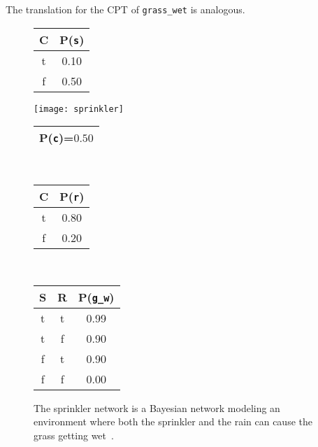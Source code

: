 \documentclass[a4paper]{article}
\begin{document}
The translation for the CPT of \texttt{grass\_wet} is analogous. 
\begin{figure}[t]
  \centering
\begin{minipage}[c]{2cm}
    \begin{tabular}{|c|c|}\hline
        C & P(\texttt{s}) \\ \hline
        t & 0.10 \\
        f & 0.50\\ \hline
      \end{tabular}
\end{minipage}
\begin{minipage}[c]{5cm}
\texttt{[image: sprinkler]}
\end{minipage}
\begin{minipage}[c]{3cm}
\centering
  \begin{tabular}{|c|}
         \hline P(\texttt{c})=$0.50$\\ \hline
       \end{tabular}\\
\vspace{0.2cm}
    \begin{tabular}{|c|c|}\hline
        C & P(\texttt{r}) \\ \hline
        t & 0.80 \\ f & 0.20\\ \hline
      \end{tabular}\\
 \vspace{0.2cm}
    \begin{tabular}{|cc|c|}\hline
        S & R & P(\texttt{g\_w}) \\ \hline
        t  & t &  0.99 \\
        t& f & 0.90 \\
        f & t & 0.90 \\
        f & f & 0.00 \\ \hline
      \end{tabular}
\end{minipage}
 \caption{The sprinkler network is a Bayesian network modeling an environment where both the sprinkler and the rain can cause the grass getting wet~\citep{russel:ai}.}
  \label{fig:sprinkler}
\end{figure}
\end{document}
